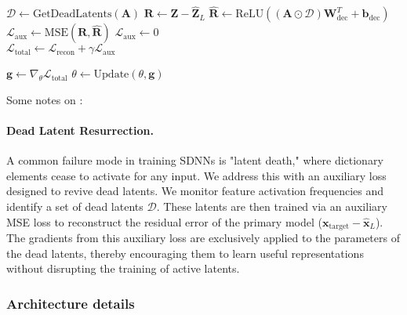 \begin{algorithm}[bh]
\begin{algorithmic}[1]
    \Statex {}
    \State $\mathcal{D} \gets \text{GetDeadLatents}(\mathbf{A})$
     
        \State $\mathbf{R} \gets \mathbf{Z} - \hat{\mathbf{Z}}_L$ 
        \State $\hat{\mathbf{R}} \gets \text{ReLU}((\mathbf{A} \odot \mathcal{D}) \mathbf{W}_{\text{dec}}^T + \mathbf{b}_{\text{dec}})$ 
        \State $\mathcal{L}_{\text{aux}} \gets \text{MSE}(\mathbf{R}, \hat{\mathbf{R}})$ 
    \Else
        \State $\mathcal{L}_{\text{aux}} \gets 0$
    \EndIf
    \\
    \State $\mathcal{L}_{\text{total}} \gets \mathcal{L}_{\text{recon}} + \gamma \mathcal{L}_{\text{aux}}$ 

    \Statex {}
    \State $\mathbf{g} \gets \nabla_{\theta} \mathcal{L}_{\text{total}}$ 
    \State $\theta \gets \text{Update}(\theta, \mathbf{g})$ 
\EndProcedure
\end{algorithmic}
\end{algorithm}

Some notes on :

\paragraph{Dead Latent Resurrection.}
A common failure mode in training SDNNs is "latent death," where dictionary elements cease to activate for any input. We address this with an auxiliary loss designed to revive dead latents. We monitor feature activation frequencies and identify a set of dead latents $\mathcal{D}$. These latents are then trained via an auxiliary MSE loss to reconstruct the residual error of the primary model ($\mathbf{x}_{\text{target}} - \hat{\mathbf{x}}_L$). The gradients from this auxiliary loss are exclusively applied to the parameters of the dead latents, thereby encouraging them to learn useful representations without disrupting the training of active latents.

\subsubsection{Architecture details}
\label{subsubsection:architecture_details}


